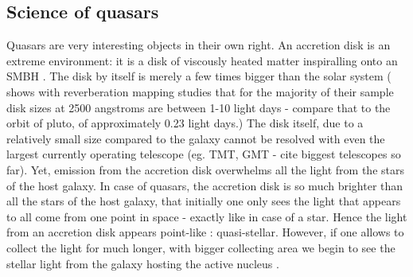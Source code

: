 \documentclass[modern]{aastex62}
\begin{document}
\subsection{Science of quasars}
Quasars are very interesting objects in their own right. An accretion disk is an extreme environment: it is a disk of viscously heated matter inspiralling onto an SMBH \citep{ruan2017}. The disk by itself is merely a few times bigger than the solar system (\citep{mudd2017} shows with reverberation mapping studies that for the majority of their sample disk sizes at 2500 angstroms are between 1-10 light days - compare that to the orbit of pluto, of approximately 0.23 light days.) The disk itself, due to a relatively small size compared to the galaxy cannot be resolved with even the largest currently operating telescope (eg. TMT, GMT - cite biggest telescopes so far).  Yet, emission from the accretion disk overwhelms all the light from the stars of the host galaxy.   In case of quasars, the accretion disk is so much brighter than all the stars of the host galaxy, that initially one only sees the light that appears to all come from one point in space - exactly like in case of a star. Hence the light from an accretion disk appears point-like : quasi-stellar. However,  if one allows to collect the light for much longer, with bigger collecting area  we begin to see the stellar light from the galaxy hosting the active nucleus \citep{hutchings2002,kotilainen2013, falomo2014, liuzzo2016, bayliss2017}. 
\end{document}

